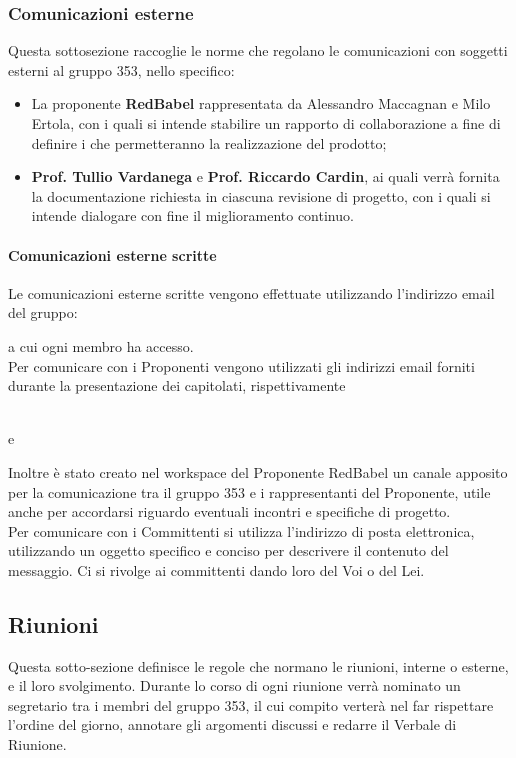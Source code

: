 \documentclass[NormeDiProgetto.tex]{subfiles}
\begin{document}
	\subsubsection{Comunicazioni esterne}
	Questa sottosezione raccoglie le norme che regolano le comunicazioni con soggetti esterni al gruppo 353, nello specifico:
	\begin{itemize}
		\item La proponente \textbf{RedBabel} rappresentata da Alessandro Maccagnan e Milo Ertola, con i quali si intende stabilire un rapporto di collaborazione a fine di definire i  che permetteranno la realizzazione del prodotto;
		\item \textbf{Prof. Tullio Vardanega} e \textbf{Prof. Riccardo Cardin}, ai quali verrà fornita la documentazione richiesta in ciascuna revisione di progetto, con i quali si intende dialogare con fine il miglioramento continuo.
	\end{itemize}
	\paragraph{Comunicazioni esterne scritte}
	Le comunicazioni esterne scritte vengono effettuate utilizzando l'indirizzo email del gruppo:
	\begin{center}
		\mailleaf
	\end{center}
	a cui ogni membro ha accesso.\\
	Per comunicare con i Proponenti vengono utilizzati gli indirizzi email forniti durante la presentazione dei capitolati, rispettivamente 
	\begin{center}
		 \\
		e\\
		
	\end{center}
	Inoltre è stato creato nel workspace  del Proponente RedBabel un canale apposito per la comunicazione tra il gruppo 353 e i rappresentanti del Proponente, utile anche per accordarsi riguardo eventuali incontri e specifiche di progetto.\\
	Per comunicare con i Committenti si utilizza l'indirizzo di posta elettronica, utilizzando un oggetto specifico e conciso per descrivere il contenuto del messaggio. Ci si rivolge ai committenti dando loro del Voi o del Lei.
	
	\subsection{Riunioni}
	Questa sotto-sezione definisce le regole che normano le riunioni, interne o esterne, e il loro svolgimento. Durante lo corso di ogni riunione verrà nominato un segretario tra i membri del gruppo 353, il cui compito verterà nel far rispettare l'ordine del giorno, annotare gli argomenti discussi e redarre il Verbale di Riunione.
\end{document}
